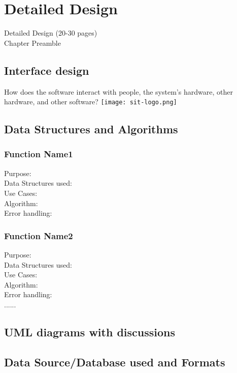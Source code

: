 \chapter{Detailed Design}
\graphicspath{{DetailedDesign/DetailedDesignFigs/EPS/}{DetailedDesign/DetailedDesignFigs/}}

Detailed Design (20-30 pages)\\
Chapter Preamble\\

\section{Interface design}
How does the software interact with people, the system's hardware, other hardware,
and other software?
\texttt{[image: sit-logo.png]}
\section{Data Structures and Algorithms}
\subsection{Function Name1}
Purpose:\\
Data Structures used:\\
Use Cases:\\
Algorithm:\\
Error handling:
\subsection{Function Name2}
Purpose:\\
Data Structures used:\\
Use Cases:\\
Algorithm:\\
Error handling:\\
......
\section{UML diagrams with discussions}
\section{Data Source/Database used and Formats}





